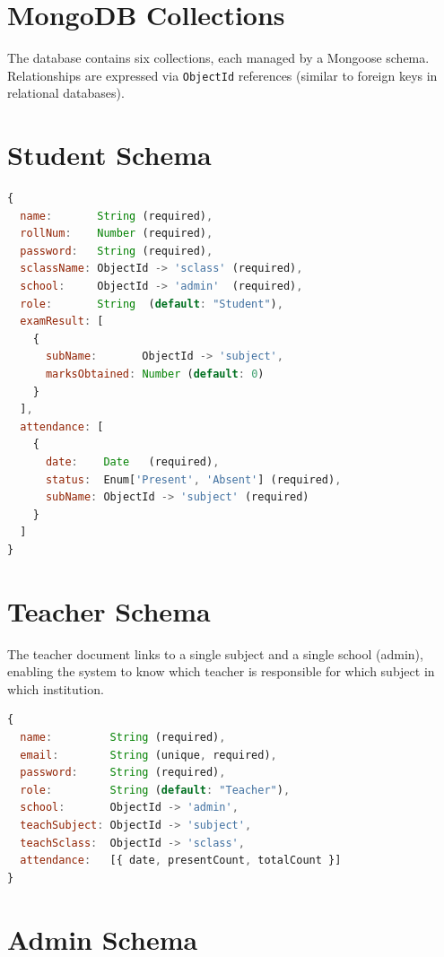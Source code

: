 \documentclass[12pt,a4paper]{report}
\begin{document}
\section{MongoDB Collections}

The database contains six collections, each managed by a Mongoose schema. Relationships are expressed via \texttt{ObjectId} references (similar to foreign keys in relational databases).

\section{Student Schema}

\begin{lstlisting}[language=JavaScript, caption=studentSchema.js]
{
  name:       String (required),
  rollNum:    Number (required),
  password:   String (required),
  sclassName: ObjectId -> 'sclass' (required),
  school:     ObjectId -> 'admin'  (required),
  role:       String  (default: "Student"),
  examResult: [
    {
      subName:       ObjectId -> 'subject',
      marksObtained: Number (default: 0)
    }
  ],
  attendance: [
    {
      date:    Date   (required),
      status:  Enum['Present', 'Absent'] (required),
      subName: ObjectId -> 'subject' (required)
    }
  ]
}
\end{lstlisting}

\section{Teacher Schema}

The teacher document links to a single subject and a single school (admin), enabling the system to know which teacher is responsible for which subject in which institution.

\begin{lstlisting}[language=JavaScript, caption=teacherSchema.js (summarized)]
{
  name:         String (required),
  email:        String (unique, required),
  password:     String (required),
  role:         String (default: "Teacher"),
  school:       ObjectId -> 'admin',
  teachSubject: ObjectId -> 'subject',
  teachSclass:  ObjectId -> 'sclass',
  attendance:   [{ date, presentCount, totalCount }]
}
\end{lstlisting}

\section{Admin Schema}
\end{document}
